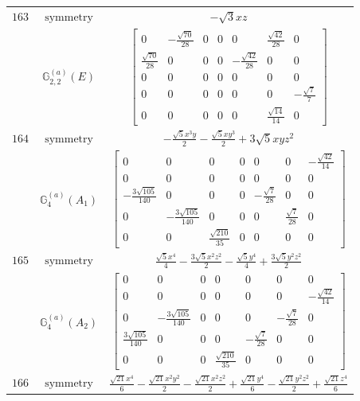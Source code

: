 \documentclass[fleqn,8pt,landscape]{jsarticle}
\begin{document}
\begin{longtable}{ccc}
$ 163 $ & $ \text{symmetry} $ & $ - \sqrt{3} x z $ \\
$  $ & $ \mathbb{G}_{2,2}^{(a)}(E) $ & $ \begin{bmatrix} 0 & - \frac{\sqrt{70}}{28} & 0 & 0 & 0 & \frac{\sqrt{42}}{28} & 0 \\ \frac{\sqrt{70}}{28} & 0 & 0 & 0 & - \frac{\sqrt{42}}{28} & 0 & 0 \\ 0 & 0 & 0 & 0 & 0 & 0 & 0 \\ 0 & 0 & 0 & 0 & 0 & 0 & - \frac{\sqrt{7}}{7} \\ 0 & 0 & 0 & 0 & 0 & \frac{\sqrt{14}}{14} & 0 \end{bmatrix} $ \\ \hline
$ 164 $ & $ \text{symmetry} $ & $ - \frac{\sqrt{5} x^{3} y}{2} - \frac{\sqrt{5} x y^{3}}{2} + 3 \sqrt{5} x y z^{2} $ \\
$  $ & $ \mathbb{G}_{4}^{(a)}(A_{1}) $ & $ \begin{bmatrix} 0 & 0 & 0 & 0 & 0 & 0 & - \frac{\sqrt{42}}{14} \\ 0 & 0 & 0 & 0 & 0 & 0 & 0 \\ - \frac{3 \sqrt{105}}{140} & 0 & 0 & 0 & - \frac{\sqrt{7}}{28} & 0 & 0 \\ 0 & - \frac{3 \sqrt{105}}{140} & 0 & 0 & 0 & \frac{\sqrt{7}}{28} & 0 \\ 0 & 0 & \frac{\sqrt{210}}{35} & 0 & 0 & 0 & 0 \end{bmatrix} $ \\ \hline
$ 165 $ & $ \text{symmetry} $ & $ \frac{\sqrt{5} x^{4}}{4} - \frac{3 \sqrt{5} x^{2} z^{2}}{2} - \frac{\sqrt{5} y^{4}}{4} + \frac{3 \sqrt{5} y^{2} z^{2}}{2} $ \\
$  $ & $ \mathbb{G}_{4}^{(a)}(A_{2}) $ & $ \begin{bmatrix} 0 & 0 & 0 & 0 & 0 & 0 & 0 \\ 0 & 0 & 0 & 0 & 0 & 0 & - \frac{\sqrt{42}}{14} \\ 0 & - \frac{3 \sqrt{105}}{140} & 0 & 0 & 0 & - \frac{\sqrt{7}}{28} & 0 \\ \frac{3 \sqrt{105}}{140} & 0 & 0 & 0 & - \frac{\sqrt{7}}{28} & 0 & 0 \\ 0 & 0 & 0 & \frac{\sqrt{210}}{35} & 0 & 0 & 0 \end{bmatrix} $ \\ \hline
$ 166 $ & $ \text{symmetry} $ & $ \frac{\sqrt{21} x^{4}}{6} - \frac{\sqrt{21} x^{2} y^{2}}{2} - \frac{\sqrt{21} x^{2} z^{2}}{2} + \frac{\sqrt{21} y^{4}}{6} - \frac{\sqrt{21} y^{2} z^{2}}{2} + \frac{\sqrt{21} z^{4}}{6} $ \\

\end{longtable}
\end{document}
